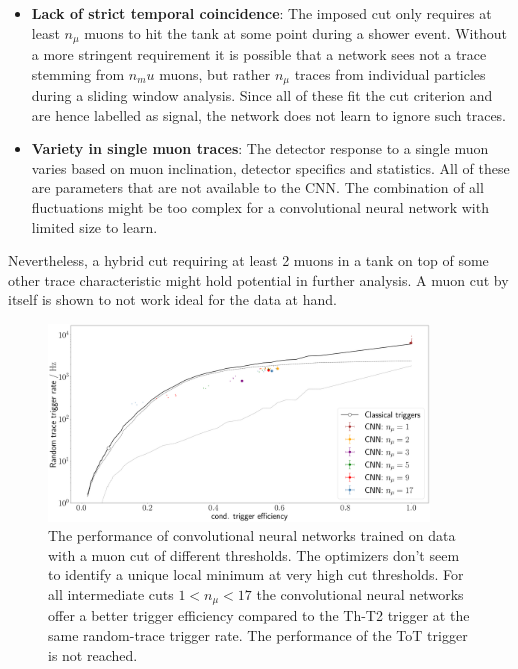 \begin{itemize}
	\item \textbf{Lack of strict temporal coincidence}: The imposed cut only requires at least $n_\mu$ muons to hit the tank at some point during a shower event. 
	Without a more stringent requirement it is possible that a network sees not a trace stemming from $n_mu$ muons, but rather $n_\mu$ traces from 
	individual particles during a sliding window analysis. Since all of these fit the cut criterion and are hence labelled as signal, the network does not learn
	to ignore such traces.
	\item \textbf{Variety in single muon traces}: The detector response to a single muon varies based on muon inclination, detector specifics and statistics. All
	of these are parameters that are not available to the CNN. The combination of all fluctuations might be too complex for a convolutional neural network with 
	limited size to learn.
\end{itemize}

Nevertheless, a hybrid cut requiring at least 2 muons in a tank on top of some other trace characteristic might hold potential in further analysis. A muon cut by
itself is shown to not work ideal for the data at hand.

\begin{figure}
	\centering
	\includegraphics[width=0.9\textwidth]{./plots/CNN_muon_cut.png}
	\caption{The performance of convolutional neural networks trained on data with a muon cut of different thresholds. The optimizers don't seem to identify a 
	unique local minimum at very high cut thresholds. For all intermediate cuts $1 < n_\mu < 17$ the convolutional neural networks offer a better trigger 
	efficiency compared to the Th-T2 trigger at the same random-trace trigger rate. The performance of the ToT trigger is not reached.}
	\label{fig:CNN-muon-cut}
\end{figure}

